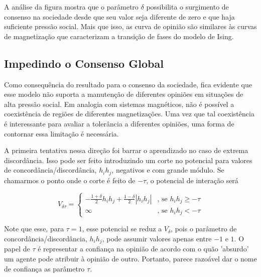 \documentclass[11pt]{article}
\begin{document}
A análise da figura mostra que o parâmetro $\delta$ possibilita o surgimento de
consenso na sociedade desde que seu valor seja diferente de zero e que haja
suficiente pressão social. Mais que isso, as curva de opinião são similares às
curvas de magnetização que caracterizam a transição de fases do modelo de Ising.


\subsection{Impedindo o Consenso Global}

Como consequência do resultado para o consenso da sociedade, fica evidente que
esse modelo não suporta a manutenção de diferentes opiniões em situações de alta
pressão social. Em analogia com sistemas magnéticos, não é possível a
coexistência de regiões de diferentes magnetizações. 
Uma vez que tal coexistência é interessante para avaliar a tolerância a
diferentes opiniões, uma forma de contornar essa limitação é necessária.

A primeira tentativa nessa direção foi barrar o aprendizado no caso de extrema
discordância. Isso pode ser feito introduzindo um corte no potencial para
valores de concordância/discordância, $h_i h_j$, negativos e com grande módulo.
Se chamarmos o ponto onde o corte é feito de $-\tau$, o potencial de interação
será

\newcommand{\ag}{%
    \ensuremath{\displaystyle%
        h_ih_j
    }
}

\newcommand{\dpos}{%
    \ensuremath{\displaystyle%
        \frac{1+\delta}{2}
    }
}

\newcommand{\dneg}{%
    \ensuremath{\displaystyle%
        \frac{1-\delta}{2}
    }
}

\[V_{\delta \tau}=
    \begin{cases}
        -\dpos \ag + \dneg |\ag| & \text{, se } \ag \geq -\tau \\
        \infty & \text{, se } \ag < -\tau
    \end{cases}
\]

Note que esse, para $\tau = 1$, esse potencial se reduz a $V_{\delta}$, pois o
parâmetro de concordância/discordância, $h_ih_j$, pode assumir valores apenas
entre $-1$ e $1$. O papel de $\tau$ é representar a confiança na opinião de
acordo com o quão 'absurdo' um agente pode atribuir à opinião de outro. 
Portanto, parece razoável dar o nome de confiança as parâmetro $\tau$.
\end{document}
